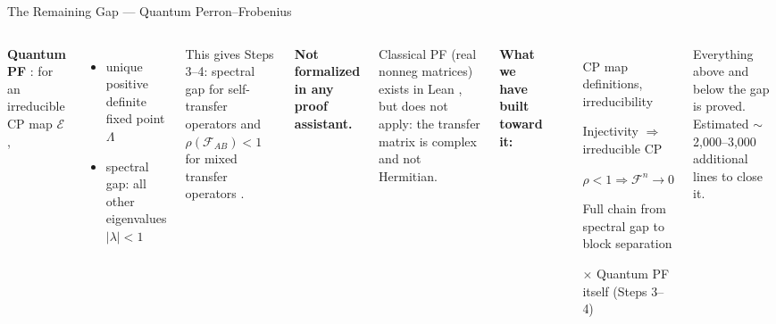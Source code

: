 \documentclass[aspectratio=169,10pt]{beamer}
\begin{document}
\begin{frame}{The Remaining Gap --- Quantum Perron--Frobenius}
    \vspace{-0.3em}

    \begin{columns}[T]
        \small
        \textbf{Quantum PF} \cite{Evans1978Spectral}: for an irreducible CP map $\mathcal{E}$,
        \begin{itemize}\itemsep0.12em
            \item unique positive definite fixed point $\Lambda$
            \item spectral gap: all other eigenvalues $|\lambda|<1$
        \end{itemize}

        \vspace{0.3em}
        This gives Steps 3--4: spectral gap for self-transfer operators
        and $\rho(\mathcal{F}_{AB})<1$ for mixed transfer operators \cite{Fernandez2015Frustration}.

        \vspace{0.4em}
        \textbf{\textcolor{softred}{Not formalized in any proof assistant.}}

        \vspace{0.2em}
        Classical PF (real nonneg matrices) exists in Lean \cite{Cipollina2025Formalized},
        but does not apply: the transfer matrix is complex and not Hermitian.

        \small
        \textbf{What we have built toward it:}
        \begin{itemize}\itemsep0.1em
            \item[\textcolor{leangreen}{\checkmark}] CP map definitions, irreducibility
            \item[\textcolor{leangreen}{\checkmark}] Injectivity $\Rightarrow$ irreducible CP
            \item[\textcolor{leangreen}{\checkmark}] $\rho<1 \Rightarrow \mathcal{F}^n \to 0$
            \item[\textcolor{leangreen}{\checkmark}] Full chain from spectral gap to block separation
            \item[\textcolor{softred}{$\times$}] Quantum PF itself (Steps 3--4)
        \end{itemize}

        \vspace{0.4em}
        Everything above and below the gap is proved.
        Estimated $\sim$2,000--3,000 additional lines to close it.
    \end{columns}
\end{frame}
\end{document}
